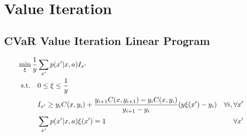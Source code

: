 \chapter{Value Iteration}\label{ch:appendix:vi}
\section{CVaR Value Iteration Linear Program}
\begin{equation}\label{eqn:cvarvilp}
\begin{split}
\min_{\xi} \dfrac{1}{y} &\sum_{x'} p(x'|x, a) I_{x'}
\\
\textup{s.t.} \quad
&0 \le \xi \le \dfrac{1}{y}\\
&I_{x'} \ge y_iC(x,y_{i})+\frac{y_{i+1}C(x,y_{i+1})-y_iC(x,y_{i})}{y_{i+1}-y_i}(y\xi(x')-y_i) &\forall i, \forall x'\\
&\sum_{x'} p(x'|x, a)\xi(x') = 1 &\forall x'
\end{split}
\end{equation}

